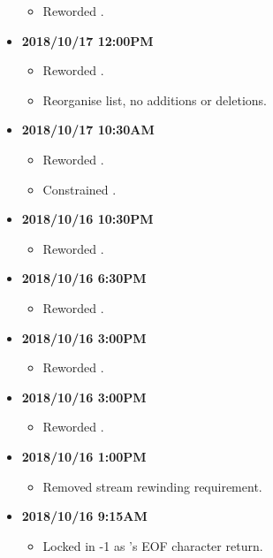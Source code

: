 \documentclass[../gazprea.tex]{subfiles}
\begin{document}
\begin{itemize}
\begin{itemize}
      \item Reworded .
    \end{itemize}
  \item
    \textbf{2018/10/17 12:00PM}
    \begin{itemize}
      \item Reworded .
      \item Reorganise  list, no additions or deletions.
    \end{itemize}
  \item
    \textbf{2018/10/17 10:30AM}
    \begin{itemize}
      \item Reworded .
      \item Constrained  .
    \end{itemize}
  \item
    \textbf{2018/10/16 10:30PM}
    \begin{itemize}
      \item Reworded .
    \end{itemize}
  \item
    \textbf{2018/10/16 6:30PM}
    \begin{itemize}
      \item Reworded .
    \end{itemize}
  \item
    \textbf{2018/10/16 3:00PM}
    \begin{itemize}
      \item Reworded .
    \end{itemize}
  \item
    \textbf{2018/10/16 3:00PM}
    \begin{itemize}
      \item Reworded .
    \end{itemize}
  \item
    \textbf{2018/10/16 1:00PM}
    \begin{itemize}
      \item Removed stream rewinding requirement.
    \end{itemize}
  \item
    \textbf{2018/10/16 9:15AM}
    \begin{itemize}
      \item Locked in -1 as 's EOF character return.

\end{itemize}
\end{itemize}
\end{document}
